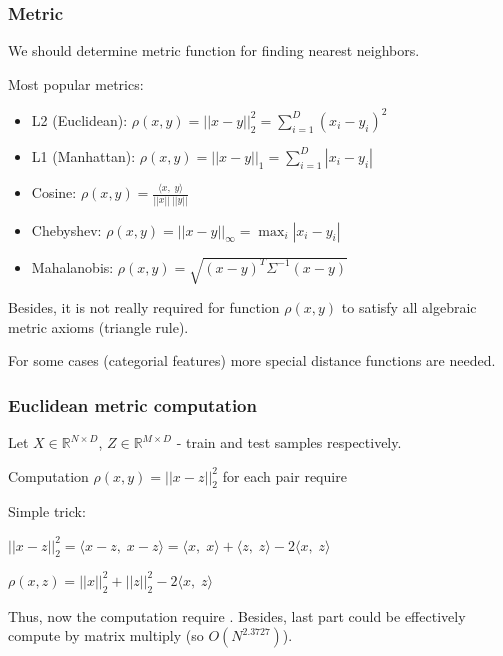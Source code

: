 \documentclass{beamer}
\begin{document}
		\begin{frame}
			\frametitle{Metric}
			
			We should determine metric function for finding nearest neighbors.
			
			Most popular metrics: 
			\begin{itemize}
				\item L2 (Euclidean): $\rho(x, y) = ||x-y||_2^2 = \sum_{i=1}^{D} (x_i - y_i)^2$
				\item L1 (Manhattan): $\rho(x, y) = ||x-y||_1 = \sum_{i=1}^{D} |x_i - y_i|$
				\item Cosine: $\rho(x, y) = \frac{\langle x,\; y \rangle}{||x||\:||y||}$
				\item Chebyshev: $\rho(x, y) = ||x-y||_{\infty} = \max_i |x_i - y_i|$
				\item Mahalanobis: $\rho(x, y) = \sqrt{(x-y)^T\Sigma^{-1}(x-y)}$
			\end{itemize}
		
		Besides, it is not really required for function $\rho(x, y)$ to satisfy all algebraic metric axioms (triangle rule).
		
		For some cases (categorial features) more special distance functions are needed.
			
		\end{frame}
	

		\begin{frame}
			\frametitle{Euclidean metric computation}
			
			Let $X \in \mathbb{R}^{N\times D}$, $Z \in \mathbb{R}^{M\times D}$ - train and test samples respectively.
			
			
			Computation $\rho(x, y) = ||x-z||_2^2$ for each pair require 
			
			Simple trick:
			\begin{center}
		
			
			$||x-z||_2^2 = \langle x-z,\; x-z\rangle = \langle x,\; x\rangle + \langle z,\; z\rangle - 2\langle x,\; z\rangle $ 
			\\ 
			\end{center}
			\begin{center}	
			$\rho(x, z) = ||x||_2^2 + ||z||_2^2 - 2\langle x,\; z\rangle$
			\end{center}
			Thus, now the computation require  . Besides, last part could be effectively compute by matrix multiply (so $O(N^{2.3727})$).
		
		\end{frame}
		
\end{document}
